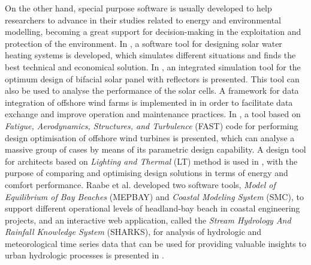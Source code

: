 \documentclass[energies,article,submit,moreauthors,pdftex]{Definitions/mdpi}
\begin{document}
		On the other hand, special purpose software is usually developed to help researchers to advance in their studies related to energy and environmental modelling, becoming a great support for decision-making in the exploitation and protection of the environment. In \cite{CAMARGONOGUEIRA2016361}, a software tool for designing solar water heating systems is developed, which simulates different situations and finds the best technical and economical solution. In \cite{LO2015293}, an integrated simulation tool for the optimum design of bifacial solar panel with reflectors is presented. This tool can also be used to analyse the performance of the solar cells. A framework for data integration of offshore wind farms is implemented in \cite{NGUYEN2013150} in order to facilitate data exchange and improve operation and maintenance practices. In \cite{GUTIERREZ201369}, a tool based on \textit{Fatigue, Aerodynamics, Structures, and Turbulence} (FAST) code for performing design optimisation of offshore wind turbines is presented, which can analyse a massive group of cases by means of its parametric design capability. A design tool for architects based on \textit{Lighting and Thermal} (LT) method is used in \cite{BAKER2013156}, with the purpose of comparing and optimising design solutions in terms of energy and comfort performance. Raabe et al. \cite{RAABE2010213} developed two software tools, \textit{Model of Equilibrium of Bay Beaches} (MEPBAY) and \textit{Coastal Modeling System} (SMC), to support different operational levels of headland-bay beach in coastal engineering projects, and an interactive web application, called the \textit{Stream Hydrology And Rainfall Knowledge System} (SHARKS), for analysis of hydrologic and meteorological time series data that can be used for providing valuable insights to urban hydrologic processes is presented in \cite{BRENDEL2019}.
		
\end{document}

